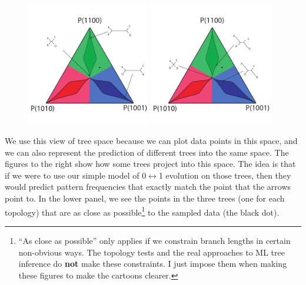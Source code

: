 \documentclass[11pt]{article}
\begin{document}
\begin{figure}
  \begin{center}
   \vspace{-40pt}
    \includegraphics[width=0.48\textwidth]{../newimages/simple-treespace-trees.pdf}
   \vspace{-10pt}
    \includegraphics[width=0.48\textwidth]{../newimages/simple-treespace-trees2.pdf}
    \vspace{-120pt}
  \end{center}
\end{figure}
We use this view of tree space because we can plot data points in this space, and we can also represent the prediction of different trees into the same space.
The figures to the right show how some trees project into this space.  
The idea is that if we were to use our simple model of 0$\leftrightarrow$1 evolution on those trees, then they would predict pattern frequencies that exactly match the point that the arrows point to.
In the lower panel, we see the points in the three trees (one for each topology) that are as close as possible\footnote{``As close as possible'' only applies if we constrain branch lengths in certain non-obvious ways. The topology tests and the real approaches to ML tree inference do {\bf not} make these constraints. I just impose them when making these figures to make the cartoons clearer.} to the sampled data (the black dot).
\end{document}
